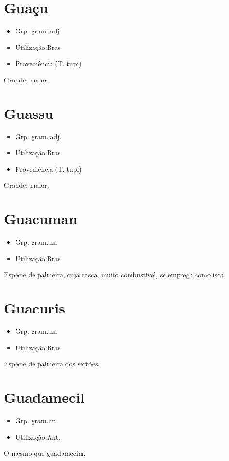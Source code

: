 \section{Guaçu}
\begin{itemize}
\item {Grp. gram.:adj.}
\end{itemize}
\begin{itemize}
\item {Utilização:Bras}
\end{itemize}
\begin{itemize}
\item {Proveniência:(T. tupi)}
\end{itemize}
Grande; maior.
\section{Guassu}
\begin{itemize}
\item {Grp. gram.:adj.}
\end{itemize}
\begin{itemize}
\item {Utilização:Bras}
\end{itemize}
\begin{itemize}
\item {Proveniência:(T. tupi)}
\end{itemize}
Grande; maior.
\section{Guacuman}
\begin{itemize}
\item {Grp. gram.:m.}
\end{itemize}
\begin{itemize}
\item {Utilização:Bras}
\end{itemize}
Espécie de palmeira, cuja casca, muito combustível, se emprega como isca.
\section{Guacuris}
\begin{itemize}
\item {Grp. gram.:m.}
\end{itemize}
\begin{itemize}
\item {Utilização:Bras}
\end{itemize}
Espécie de palmeira dos sertões.
\section{Guadamecil}
\begin{itemize}
\item {Grp. gram.:m.}
\end{itemize}
\begin{itemize}
\item {Utilização:Ant.}
\end{itemize}
O mesmo que \textunderscore guadamecim\textunderscore .
